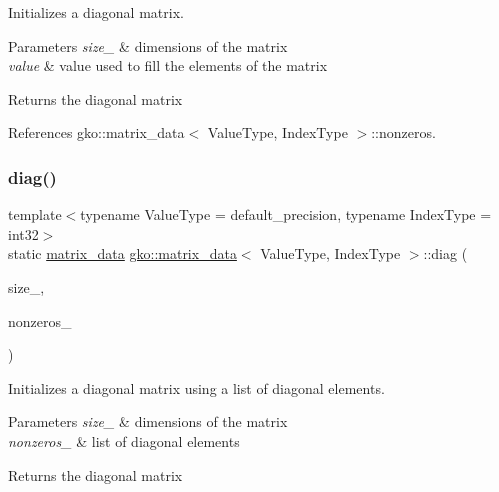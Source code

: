 Initializes a diagonal matrix. 


\begin{DoxyParams}{Parameters}
{\em size\+\_\+} & dimensions of the matrix \\
\hline
{\em value} & value used to fill the elements of the matrix\\
\hline
\end{DoxyParams}
\begin{DoxyReturn}{Returns}
the diagonal matrix 
\end{DoxyReturn}


References gko\+::matrix\+\_\+data$<$ Value\+Type, Index\+Type $>$\+::nonzeros.

\mbox{\label{structgko_1_1matrix__data_aa80c7201a72ebf5b79a793b8d38db8e2}} 
\subsubsection{\texorpdfstring{diag()}{diag()}\hspace{0.1cm}{\footnotesize\ttfamily [2/5]}}
{\footnotesize\ttfamily template$<$typename Value\+Type = default\+\_\+precision, typename Index\+Type = int32$>$ \\
static \hyperlink{structgko_1_1matrix__data}{matrix\+\_\+data} \hyperlink{structgko_1_1matrix__data}{gko\+::matrix\+\_\+data}$<$ Value\+Type, Index\+Type $>$\+::diag (\begin{DoxyParamCaption}\item[{\hyperlink{structgko_1_1dim}{dim}$<$ 2 $>$}]{size\+\_\+,  }\item[{std\+::initializer\+\_\+list$<$ Value\+Type $>$}]{nonzeros\+\_\+ }\end{DoxyParamCaption})\hspace{0.3cm}{\ttfamily [static]}}



Initializes a diagonal matrix using a list of diagonal elements. 


\begin{DoxyParams}{Parameters}
{\em size\+\_\+} & dimensions of the matrix \\
\hline
{\em nonzeros\+\_\+} & list of diagonal elements\\
\hline
\end{DoxyParams}
\begin{DoxyReturn}{Returns}
the diagonal matrix 
\end{DoxyReturn}


